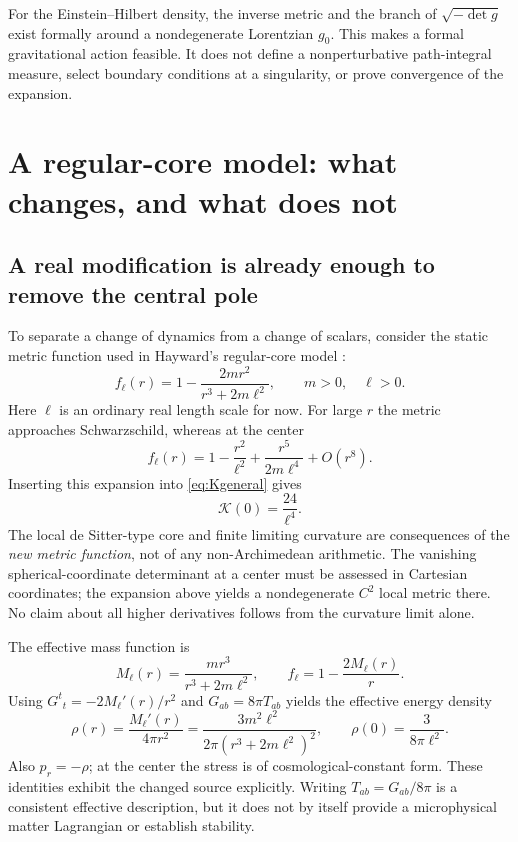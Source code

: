 \documentclass[11pt,a4paper]{article}
\numberwithin{equation}{section}
\theoremstyle{definition}
\theoremstyle{remark}
\newcommand{\Kret}{\mathcal K}
\begin{document}
For the Einstein--Hilbert density, the inverse metric and the branch of
$\sqrt{-\det g}$ exist formally around a nondegenerate Lorentzian $g_0$.
This makes a formal gravitational action feasible. It does not define a
nonperturbative path-integral measure, select boundary conditions at a
singularity, or prove convergence of the expansion.

\section{A regular-core model: what changes, and what does not}\label{sec:core}

\subsection{A real modification is already enough to remove the central pole}
To separate a change of dynamics from a change of scalars, consider the
static metric function used in Hayward's regular-core model
\cite{Hayward}:
\begin{equation}\label{eq:hayward}
f_\ell(r)=1-\frac{2mr^2}{r^3+2m\ell^2},\qquad m>0,\quad\ell>0.
\end{equation}
Here $\ell$ is an ordinary real length scale for now. For large $r$ the metric
approaches Schwarzschild, whereas at the center
\begin{equation}\label{eq:haywardcenter}
f_\ell(r)=1-\frac{r^2}{\ell^2}
              +\frac{r^5}{2m\ell^4}+O(r^8).
\end{equation}
Inserting this expansion into \eqref{eq:Kgeneral} gives
\begin{equation}\label{eq:haywardK}
\Kret(0)=\frac{24}{\ell^4}.
\end{equation}
The local de Sitter-type core and finite limiting curvature are consequences of
the \emph{new metric function}, not of any non-Archimedean arithmetic. The
vanishing spherical-coordinate determinant at a center must be assessed in
Cartesian coordinates; the expansion above yields a nondegenerate $C^2$ local
metric there. No claim about all higher derivatives follows from the curvature
limit alone.

The effective mass function is
\[
M_\ell(r)=\frac{mr^3}{r^3+2m\ell^2},
\qquad f_\ell=1-\frac{2M_\ell(r)}r.
\]
Using $G^t{}_t=-2M_\ell'(r)/r^2$ and $G_{ab}=8\pi T_{ab}$ yields the effective
energy density
\begin{equation}\label{eq:haywardrho}
\rho(r)=\frac{M_\ell'(r)}{4\pi r^2}
       =\frac{3m^2\ell^2}{2\pi(r^3+2m\ell^2)^2},
\qquad \rho(0)=\frac{3}{8\pi\ell^2}.
\end{equation}
Also $p_r=-\rho$; at the center the stress is of cosmological-constant form.
These identities exhibit the changed source explicitly. Writing
$T_{ab}=G_{ab}/8\pi$ is a consistent effective description, but it does not by
itself provide a microphysical matter Lagrangian or establish stability.
\end{document}
